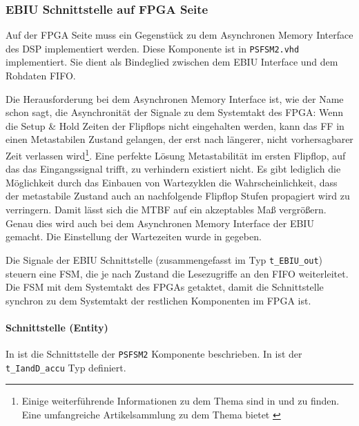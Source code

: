 \subsubsection{EBIU Schnittstelle auf FPGA Seite}

Auf der FPGA Seite muss ein Gegenstück zu dem Asynchronen Memory Interface des DSP implementiert werden. Diese Komponente ist in \lstinline$PSFSM2.vhd$ implementiert. Sie dient als Bindeglied zwischen dem EBIU Interface und dem Rohdaten FIFO.

Die Herausforderung bei dem Asynchronen Memory Interface ist, wie der Name schon sagt, die Asynchronität der Signale zu dem Systemtakt des FPGA: Wenn die Setup \& Hold Zeiten der Flipflops nicht eingehalten werden, kann das FF in einen Metastabilen Zustand gelangen, der erst nach längerer, nicht vorhersagbarer Zeit verlassen wird\footnote{Einige weiterführende Informationen zu dem Thema sind in \cite{FPGAFAQMetastability} und \cite{ginosar2011metastability} zu finden. Eine umfangreiche Artikelsammlung zu dem Thema bietet \cite{MetastabilityBibliography}}. 
Eine perfekte Lösung Metastabilität im ersten Flipflop, auf das das Eingangssignal trifft, zu verhindern existiert nicht. Es gibt lediglich die Möglichkeit durch das Einbauen von Wartezyklen die Wahrscheinlichkeit, dass der metastabile Zustand auch an nachfolgende Flipflop Stufen propagiert wird zu verringern. Damit lässt sich die \gls{MTBF} auf ein akzeptables Maß vergrößern. Genau dies wird auch bei dem Asynchronen Memory Interface der EBIU gemacht. Die Einstellung der Wartezeiten wurde in  gegeben.

Die Signale der EBIU Schnittstelle (zusammengefasst im Typ \lstinline$t_EBIU_out$) steuern eine \gls{FSM}, die je nach Zustand die Lesezugriffe an den FIFO weiterleitet. Die \gls{FSM} mit dem Systemtakt des FPGAs getaktet, damit die Schnittstelle synchron zu dem Systemtakt der restlichen Komponenten im FPGA ist.

\paragraph{Schnittstelle (Entity)}
In  ist die Schnittstelle der \lstinline$PSFSM2$ Komponente beschrieben. In  ist der \lstinline$t_IandD_accu$ Typ definiert.

